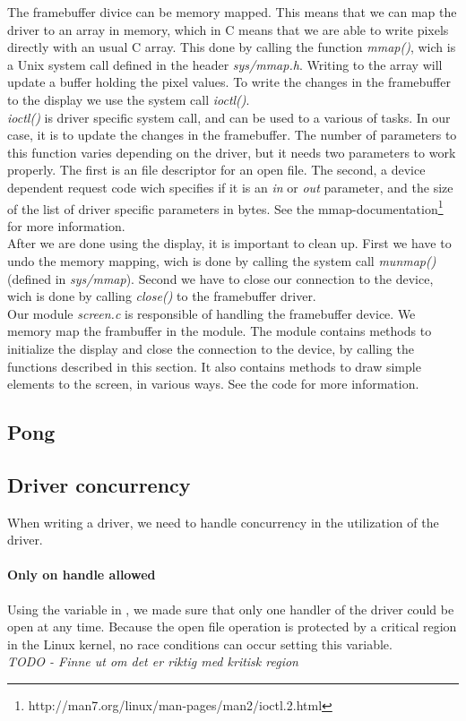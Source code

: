The framebuffer divice can be memory mapped. This means that we can map the driver to an array in memory, which in C means that we are able to write pixels directly with an usual C array. This done by calling the function \emph{mmap()}, wich is a Unix system call defined in the header \emph{sys/mmap.h}. 
Writing to the array will update a buffer holding the pixel values. To write the changes in the framebuffer to the display we use the system call \emph{ioctl()}. \\

\emph{ioctl()} is driver specific system call, and can be used to a various of tasks. In our case, it is to update the changes in the framebuffer. The number of parameters to this function varies depending on the driver, but it needs two parameters to work properly. The first is an file descriptor for an open file. The second, a device dependent request code wich specifies if it is an \emph{in} or \emph{out} parameter, and the size of the list of driver specific parameters in bytes. See the mmap-documentation\footnote{http://man7.org/linux/man-pages/man2/ioctl.2.html} for more information.   
\\

After we are done using the display, it is important to clean up. First we have to undo the memory mapping, wich is done by calling the system call \emph{munmap()} (defined in \emph{sys/mmap}). Second we have to close our connection to the device, wich is done by calling \emph{close()} to the framebuffer driver. \\

Our module \emph{screen.c} is responsible of handling the framebuffer device. We memory map the frambuffer in the module. The module contains methods to initialize the display and close the connection to the device, by calling the functions described in this section. It also contains methods to draw simple elements to the screen, in various ways. See the code for more information. 

\subsection{Pong}

\subsection{Driver concurrency}
When writing a driver, we need to handle concurrency in the utilization of the driver.
\paragraph{Only on handle allowed}
Using the  variable in , we made sure that only one handler of the driver could be open at any time. Because the open file operation is protected by a critical region in the Linux kernel, no race conditions can occur setting this variable.\\
\emph{TODO - Finne ut om det er riktig med kritisk region}
